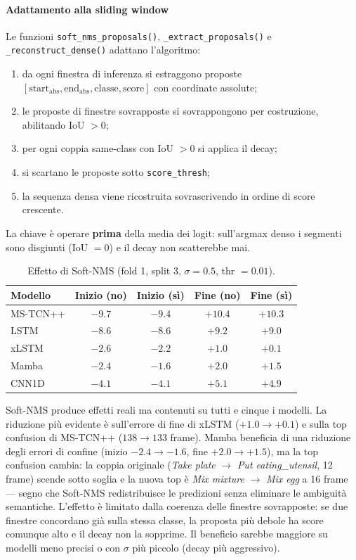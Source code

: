 \documentclass[12pt, a4paper]{article}
\begin{document}
\paragraph{Adattamento alla sliding window}
Le funzioni \texttt{soft\_nms\_proposals()}, \texttt{\_extract\_proposals()} e
\texttt{\_reconstruct\_dense()} adattano l'algoritmo:
\begin{enumerate}[noitemsep]
  \item da ogni finestra di inferenza si estraggono proposte
        $[\text{start}_{\text{abs}}, \text{end}_{\text{abs}}, \text{classe},
        \text{score}]$ con coordinate assolute;
  \item le proposte di finestre sovrapposte si sovrappongono per costruzione,
        abilitando IoU $> 0$;
  \item per ogni coppia same-class con IoU $> 0$ si applica il decay;
  \item si scartano le proposte sotto \texttt{score\_thresh};
  \item la sequenza densa viene ricostruita sovrascrivendo in ordine di score
        crescente.
\end{enumerate}
La chiave \`e operare \textbf{prima} della media dei logit: sull'argmax denso i
segmenti sono disgiunti (IoU $= 0$) e il decay non scatterebbe mai.

\begin{table}[H]
\centering
\caption{Effetto di Soft-NMS (fold 1, split 3, $\sigma=0.5$, thr $=0.01$).}
\begin{tabular}{lcccc}
\toprule
\textbf{Modello} & \textbf{Inizio (no)} & \textbf{Inizio (s\`i)}
& \textbf{Fine (no)} & \textbf{Fine (s\`i)} \\
\midrule
MS-TCN++ & $-9.7$ & $-9.4$ & $+10.4$ & $+10.3$ \\
LSTM     & $-8.6$ & $-8.6$ & $+9.2$  & $+9.0$  \\
xLSTM    & $-2.6$ & $-2.2$ & $+1.0$  & $+0.1$  \\
Mamba    & $-2.4$ & $-1.6$ & $+2.0$  & $+1.5$  \\
CNN1D    & $-4.1$ & $-4.1$ & $+5.1$  & $+4.9$  \\
\bottomrule
\end{tabular}
\end{table}

Soft-NMS produce effetti reali ma contenuti su tutti e cinque i modelli.
La riduzione pi\`u evidente \`e sull'errore di fine di xLSTM ($+1.0 \to +0.1$)
e sulla top confusion di MS-TCN++ ($138 \to 133$ frame).
Mamba beneficia di una riduzione degli errori di confine
(inizio $-2.4 \to -1.6$, fine $+2.0 \to +1.5$), ma la top confusion cambia:
la coppia originale (\textit{Take plate} $\to$ \textit{Put eating\_utensil},
12 frame) scende sotto soglia e la nuova top \`e
\textit{Mix mixture} $\to$ \textit{Mix egg} a 16 frame --- segno che
Soft-NMS redistribuisce le predizioni senza eliminare le ambiguit\`a semantiche.
L'effetto \`e limitato dalla coerenza delle finestre sovrapposte: se due
finestre concordano gi\`a sulla stessa classe, la proposta pi\`u debole ha
score comunque alto e il decay non la sopprime. Il beneficio sarebbe maggiore
su modelli meno precisi o con $\sigma$ pi\`u piccolo (decay pi\`u aggressivo).
\end{document}
